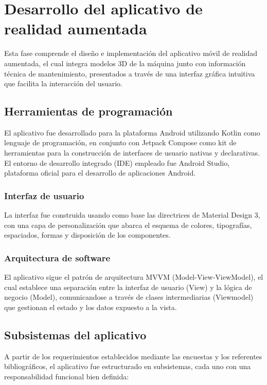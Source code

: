\section{Desarrollo del aplicativo de realidad aumentada}

    Esta fase comprende el diseño e implementación del aplicativo móvil de realidad aumentada, el cual integra modelos 3D de la máquina junto con información técnica de mantenimiento, presentados a través de una interfaz gráfica intuitiva que facilita la interacción del usuario.

    \subsection{Herramientas de programación}

        El aplicativo fue desarrollado para la plataforma Android utilizando Kotlin como lenguaje de programación, en conjunto con Jetpack Compose como kit de herramientas para la construcción de interfaces de usuario nativas y declarativas. El entorno de desarrollo integrado (IDE) empleado fue Android Studio, plataforma oficial para el desarrollo de aplicaciones Android.

        \subsubsection{Interfaz de usuario}

            La interfaz fue construida usando como base las directrices de Material Design 3, con una capa de personalización que abarca el esquema de colores, tipografías, espaciados, formas y disposición de los componentes.

        \subsubsection{Arquitectura de software}

            El aplicativo sigue el patrón de arquitectura MVVM (Model-View-ViewModel), el cual establece una separación entre la interfaz de usuario (View) y la lógica de negocio (Model), comunicandose a través de clases intermediarias (Viewmodel) que gestionan el estado y los datos expuesto a la vista.

    \subsection{Subsistemas del aplicativo}

        A partir de los requerimientos establecidos mediante las encuestas y los referentes bibliográficos, el aplicativo fue estructurado en subsistemas, cada uno con una responsabilidad funcional bien definida:

